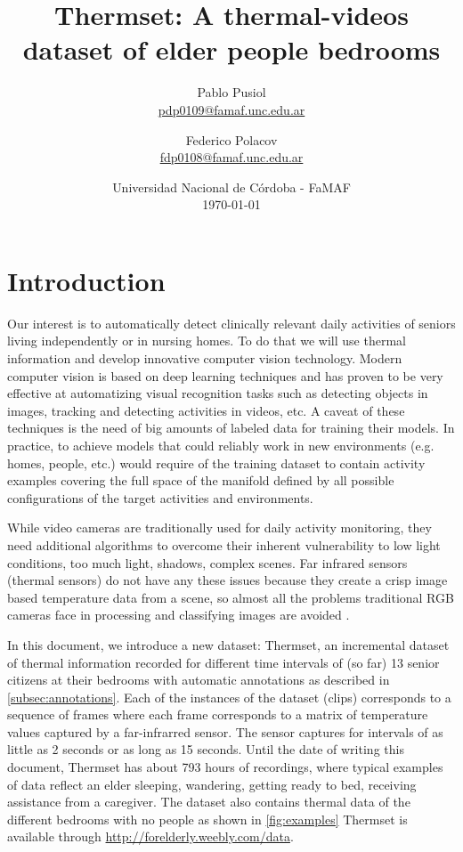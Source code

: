 \documentclass[oneside, twocolumn]{article}
\title{\LARGE Thermset: A thermal-videos dataset of elder people bedrooms} %
\author{Pablo Pusiol\\ \href{mailto:pdp0109@famaf.unc.edu.ar \qquad Pablo Pusiol }{pdp0109@famaf.unc.edu.ar} \and Federico Polacov \\\href{mailto:fdp0108@famaf.unc.edu.ar}{fdp0108@famaf.unc.edu.ar}}
\date{Universidad Nacional de C\'ordoba - FaMAF \\ \today}
\newcommand\TotalHoursOfRecording{793}
\newcommand\NumberOfPeople{13}
\begin{document}
\maketitle


\section{Introduction}
\label{sec:introduction}
Our interest is to automatically detect clinically relevant daily activities of seniors living independently
or in nursing homes. To do that we will use thermal information and develop innovative computer vision technology.
Modern computer vision is based on deep learning techniques and has proven to be very effective at automatizing
visual recognition tasks such as detecting objects in images, tracking and detecting activities in videos, etc.
A caveat of these techniques is the need of big amounts of labeled data for training their models. In practice,
to achieve  models that could reliably work in new  environments (e.g. homes, people, etc.) would require of the
training dataset to contain activity examples covering the full space of the manifold defined by all possible
configurations of the target activities and environments.

While video cameras are traditionally used for daily activity monitoring, they need additional algorithms to
overcome their inherent vulnerability to low light conditions, too much light, shadows, complex scenes. Far
infrared sensors (thermal sensors) do not have any these issues because they create a crisp image based temperature
data from a scene, so almost all the problems traditional RGB cameras face in processing and classifying images are
avoided \cite{chengl}.

In this document, we introduce a new dataset: Thermset, an incremental dataset of thermal information recorded
for different time intervals of (so far) \NumberOfPeople{} senior citizens at their bedrooms with automatic
annotations as described in \autoref{subsec:annotations}. Each of the instances of the dataset (clips) corresponds
 to a sequence of frames where each frame corresponds to a matrix of temperature values captured by a
 far-infrarred sensor. The sensor captures for intervals of as little as 2 seconds or as long as 15 seconds. Until
 the date of writing this document, Thermset has about \TotalHoursOfRecording{} hours of recordings, where typical
 examples of data reflect an elder sleeping, wandering, getting ready to bed, receiving assistance from a caregiver.
 The dataset also contains thermal data of the different bedrooms with no people as shown in \autoref{fig:examples}
 Thermset is available through \url{http://forelderly.weebly.com/data}.
\end{document}
